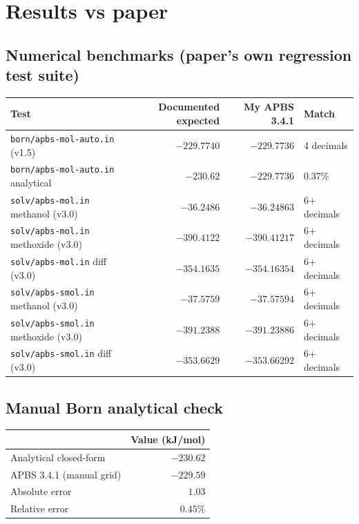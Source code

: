 \documentclass[11pt]{article}
\begin{document}
\section{Results vs paper}

\subsection{Numerical benchmarks (paper's own regression test suite)}

\begin{longtable}{lrrl}
\toprule
Test & Documented expected & My APBS 3.4.1 & Match \\
\midrule
\texttt{born/apbs-mol-auto.in} (v1.5)          & $-229.7740$ & $\mathbf{-229.7736}$ & 4 decimals \\
\texttt{born/apbs-mol-auto.in} analytical      & $-230.62$   & $-229.7736$          & 0.37\% \\
\texttt{solv/apbs-mol.in} methanol (v3.0)      & $-36.2486$  & $\mathbf{-36.24863}$ & 6+ decimals \\
\texttt{solv/apbs-mol.in} methoxide (v3.0)     & $-390.4122$ & $\mathbf{-390.41217}$ & 6+ decimals \\
\texttt{solv/apbs-mol.in} diff (v3.0)          & $-354.1635$ & $\mathbf{-354.16354}$ & 6+ decimals \\
\texttt{solv/apbs-smol.in} methanol (v3.0)     & $-37.5759$  & $\mathbf{-37.57594}$ & 6+ decimals \\
\texttt{solv/apbs-smol.in} methoxide (v3.0)    & $-391.2388$ & $\mathbf{-391.23886}$ & 6+ decimals \\
\texttt{solv/apbs-smol.in} diff (v3.0)         & $-353.6629$ & $\mathbf{-353.66292}$ & 6+ decimals \\
\bottomrule
\end{longtable}

\subsection{Manual Born analytical check}
\begin{tabular}{lr}
\toprule
                                  & Value (kJ/mol) \\
\midrule
Analytical closed-form            & $-230.62$ \\
APBS 3.4.1 (manual grid)          & $-229.59$ \\
Absolute error                    & $1.03$ \\
Relative error                    & $0.45\%$ \\
\bottomrule
\end{tabular}
\end{document}
